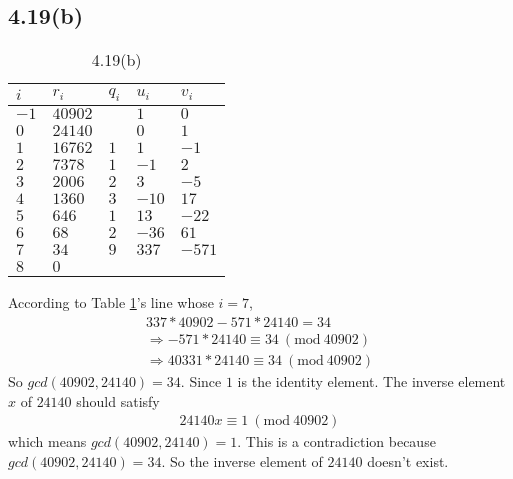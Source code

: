 \documentclass[acmlarge,screen]{acmart}
\begin{document}
\begin{CJK*}{UTF8}{gbsn}
\subsection{4.19(b)}
\begin{table}
  \caption{4.19(b)}
  \label{tab:4.19(b)}
  \begin{tabular}{m{5em} m{5em} m{5em} m{5em} m{5em}}
    \toprule
    $i$&$r_i$&$q_i$&$u_i$&$v_i$\\
    \midrule
    $-1$&$40902$&&$1$&$0$\\
    $0$&$24140$&&$0$&$1$\\
	$1$&$16762$&$1$&$1$&$-1$\\
	$2$&$7378$&$1$&$-1$&$2$\\
	$3$&$2006$&$2$&$3$&$-5$\\
	$4$&$1360$&$3$&$-10$&$17$\\
	$5$&$646$&$1$&$13$&$-22$\\
	$6$&$68$&$2$&$-36$&$61$\\
	$7$&$34$&$9$&$337$&$-571$\\
	$8$&$0$&&&\\
  \bottomrule
\end{tabular}
\end{table}
According to Table \ref{tab:4.19(b)}'s line whose $i=7$,
\begin{align*}
	337*40902-571*24140=34\\
	\Rightarrow-571*24140\equiv34\ (\text{mod}\ 40902)\\
	\Rightarrow40331*24140\equiv34\ (\text{mod}\ 40902)
\end{align*}
So $gcd(40902, 24140)=34$. Since $1$ is the identity element. The inverse element $x$ of $24140$ should satisfy
\begin{align*}
24140x\equiv1\ (\text{mod}\ 40902)	
\end{align*}
which means $gcd(40902, 24140)=1$. This is a contradiction because $gcd(40902, 24140)=34$. So the inverse element of $24140$ doesn't exist.

\end{CJK*}
\end{document}
